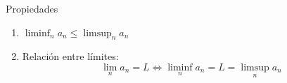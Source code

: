 \documentclass[14pt,aspectratio=169,xcolor=dvipsnames]{beamer}
\begin{document}
\begin{frame}{Propiedades}
    \begin{enumerate}
        \item $\liminf_n a_n \leq \limsup_n a_n$
        \item Relación entre límites: 
            $$ \lim_n a_n = L \Leftrightarrow \liminf_n a_n = L = \limsup_n a_n $$
    \end{enumerate}
\end{frame}
\begin{frame}
    \maketitle
\end{frame}
\end{document}
